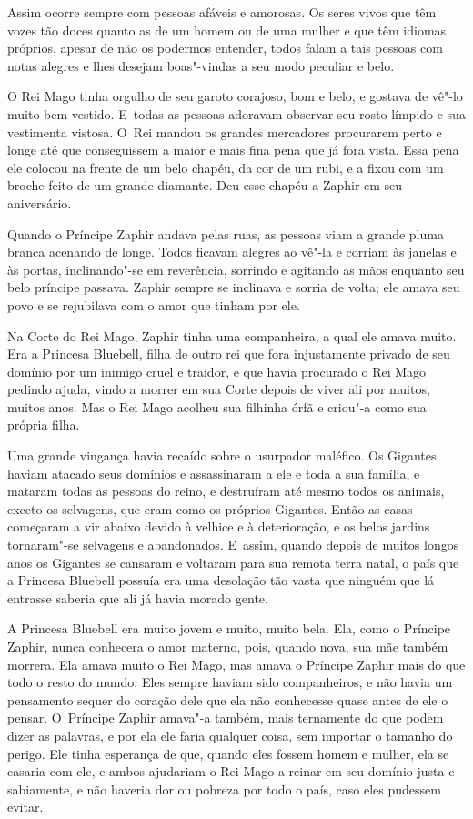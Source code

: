 Assim ocorre sempre com pessoas afáveis e amorosas. Os seres vivos que
têm vozes tão doces quanto as de um homem ou de uma mulher e que têm
idiomas próprios, apesar de não os podermos entender, todos falam a tais
pessoas com notas alegres e lhes desejam boas"-vindas a seu modo
peculiar e belo.

O Rei Mago tinha orgulho de seu garoto corajoso, bom e belo, e gostava
de vê"-lo muito bem vestido. E~todas as pessoas adoravam observar seu
rosto límpido e sua vestimenta vistosa. O~Rei mandou os grandes
mercadores procurarem perto e longe até que conseguissem a maior e mais
fina pena que já fora vista. Essa pena ele colocou na frente de um belo
chapéu, da cor de um rubi, e a fixou com um broche feito de um grande
diamante. Deu esse chapéu a Zaphir em seu aniversário.

Quando o Príncipe Zaphir andava pelas ruas, as pessoas viam
a grande pluma branca acenando de longe. Todos ficavam alegres ao vê"-la
e corriam às janelas e às portas, inclinando"-se em reverência, sorrindo
e agitando as mãos enquanto seu belo príncipe passava. Zaphir sempre se
inclinava e sorria de volta; ele amava seu povo e se rejubilava com o
amor que tinham por ele.

Na Corte do Rei Mago, Zaphir tinha uma companheira, a qual ele amava
muito. Era a Princesa Bluebell, filha de outro rei que fora injustamente
privado de seu domínio por um inimigo cruel e traidor, e que havia
procurado o Rei Mago pedindo ajuda, vindo a morrer em sua Corte depois
de viver ali por muitos, muitos anos. Mas o Rei Mago acolheu sua
filhinha órfã e criou"-a como sua própria filha.

Uma grande vingança havia recaído sobre o usurpador maléfico. Os
Gigantes haviam atacado seus domínios e assassinaram a ele e toda a sua
família, e mataram todas as pessoas do reino, e destruíram até mesmo
todos os animais, exceto os selvagens, que eram como os próprios
Gigantes. Então as casas começaram a vir abaixo devido à velhice e à
deterioração, e os belos jardins tornaram"-se selvagens e abandonados. E~assim, quando depois de muitos longos anos os Gigantes se cansaram e
voltaram para sua remota terra natal, o país que a Princesa Bluebell
possuía era uma desolação tão vasta que ninguém que lá entrasse saberia
que ali já havia morado gente.

A Princesa Bluebell era muito jovem e muito, muito bela. Ela, como o
Príncipe Zaphir, nunca conhecera o amor materno, pois, quando nova, sua
mãe também morrera. Ela amava muito o Rei Mago, mas amava o Príncipe
Zaphir mais do que todo o resto do mundo. Eles sempre haviam sido
companheiros, e não havia um pensamento sequer do coração dele que ela
não conhecesse quase antes de ele o pensar. O~Príncipe Zaphir amava"-a
também, mais ternamente do que podem dizer as palavras, e por ela ele
faria qualquer coisa, sem importar o tamanho do perigo. Ele tinha
esperança de que, quando eles fossem homem e mulher, ela se casaria com
ele, e ambos ajudariam o Rei Mago a reinar em seu domínio justa e
sabiamente, e não haveria dor ou pobreza por todo o país, caso eles
pudessem evitar.


